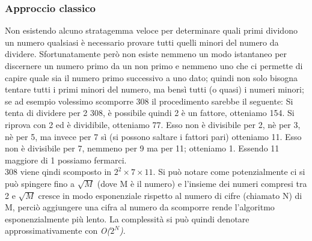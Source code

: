 \subsubsection{Approccio classico}
Non esistendo alcuno stratagemma veloce per determinare quali primi dividono un numero qualsiasi è necessario provare tutti quelli minori del numero da dividere. Sfortunatamente però non esiste nemmeno un modo istantaneo per discernere un numero primo da un non primo e nemmeno uno che ci permette di capire quale sia il numero primo successivo a uno dato; quindi non solo bisogna tentare tutti i primi minori del numero, ma bensì tutti (o quasi) i numeri minori; se ad esempio volessimo scomporre 308 il procedimento sarebbe il seguente:
Si tenta di dividere per 2 308, è possibile quindi 2 è un fattore, otteniamo 154. Si riprova con 2 ed è dividibile, otteniamo 77. Esso non è divisibile per 2, nè per 3, nè per 5, ma invece per 7 sì (si possono saltare i fattori pari) otteniamo 11. Esso non è divisibile per 7, nemmeno per 9 ma per 11; otteniamo 1. Essendo 11 maggiore di 1 possiamo fermarci.\\
308 viene qindi scomposto in $2^2 \times 7 \times 11$. Si può notare come potenzialmente ci si può spingere fino a $\sqrt{M}$ (dove M è il numero) e l'insieme dei numeri compresi tra 2 e $\sqrt{M}$ cresce in modo esponenziale rispetto al numero di cifre (chiamato N) di M, perciò aggiungere una cifra al numero da scomporre rende l'algoritmo esponenzialmente più lento. La complessità si può quindi denotare approssimativamente con \textit{O($2^N$)}.
